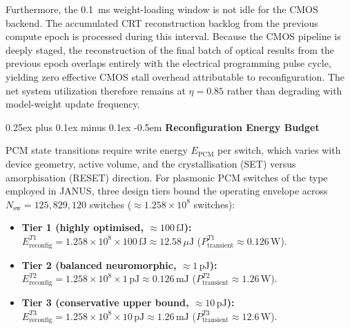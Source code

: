 \documentclass[journal]{IEEEtran}
\makeatletter
\newcommand{\subparagraph}{\@startsection{subparagraph}{5}{\parindent}%
  {0.25ex plus 0.1ex minus 0.1ex}%
  {-0.5em}%
  {\normalfont\normalsize\itshape}} %
\makeatother
\begin{document}
Furthermore, the 0.1~ms weight-loading window is not idle for the CMOS backend. The accumulated CRT reconstruction backlog from the previous compute epoch is processed during this interval. Because the CMOS pipeline is deeply staged, the reconstruction of the final batch of optical results from the previous epoch overlaps entirely with the electrical programming pulse cycle, yielding zero effective CMOS stall overhead attributable to reconfiguration. The net system utilization therefore remains at $\eta = 0.85$ rather than degrading with model-weight update frequency.

\subparagraph{\textbf{Reconfiguration Energy Budget}}

PCM state transitions require write energy $E_{\text{PCM}}$ per switch, which varies with device geometry, active volume, and the crystallisation (SET) versus amorphisation (RESET) direction. For plasmonic PCM switches of the type employed in JANUS, three design tiers bound the operating envelope across $N_{\text{sw}} = 125,829,120$ switches ($\approx 1.258 \times 10^8$ switches):

\begin{itemize}
\item \textbf{Tier 1 (highly optimised, $\approx 100\,\mathrm{fJ}$):} $E_{\text{reconfig}}^{T1} = 1.258 \times 10^8 \times 100\,\mathrm{fJ} \approx 12.58\,\mu\text{J}$ ($P_{\text{transient}}^{T1} \approx 0.126\,\text{W}$).
\item \textbf{Tier 2 (balanced neuromorphic, $\approx 1\,\mathrm{pJ}$):} $E_{\text{reconfig}}^{T2} = 1.258 \times 10^8 \times 1\,\mathrm{pJ} \approx 0.126\,\text{mJ}$ ($P_{\text{transient}}^{T2} \approx 1.26\,\text{W}$).
\item \textbf{Tier 3 (conservative upper bound, $\approx 10\,\mathrm{pJ}$):} $E_{\text{reconfig}}^{T3} = 1.258 \times 10^8 \times 10\,\mathrm{pJ} \approx 1.26\,\text{mJ}$ ($P_{\text{transient}}^{T3} \approx 12.6\,\text{W}$).
\end{itemize}
\end{document}
